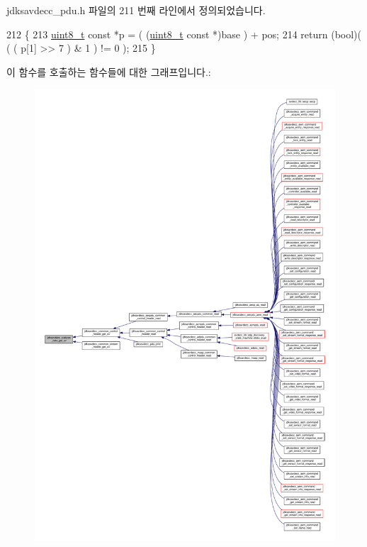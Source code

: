 jdksavdecc\+\_\+pdu.\+h 파일의 211 번째 라인에서 정의되었습니다.


\begin{DoxyCode}
212 \{
213     \hyperlink{stdint_8h_aba7bc1797add20fe3efdf37ced1182c5}{uint8\_t} \textcolor{keyword}{const} *p = ( (\hyperlink{stdint_8h_aba7bc1797add20fe3efdf37ced1182c5}{uint8\_t} \textcolor{keyword}{const} *)base ) + pos;
214     \textcolor{keywordflow}{return} (\textcolor{keywordtype}{bool})( ( ( p[1] >> 7 ) & 1 ) != 0 );
215 \}
\end{DoxyCode}


이 함수를 호출하는 함수들에 대한 그래프입니다.\+:
\nopagebreak
\begin{figure}[H]
\begin{center}
\leavevmode
\includegraphics[width=350pt]{group__jdksavdecc__subtype__data_gaf9cb8fd6301567848c0ab126ab7f562e_icgraph}
\end{center}
\end{figure}


